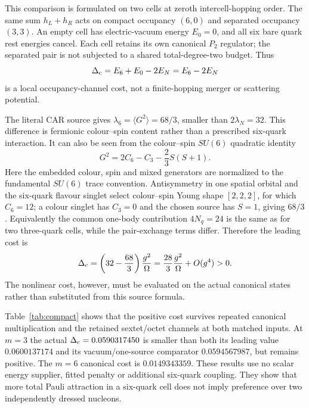 \documentclass[11pt]{article}
\begin{document}
This comparison is formulated on two cells at zeroth intercell-hopping order. The same sum $h_L+h_R$ acts on compact occupancy $(6,0)$ and separated occupancy $(3,3)$. An empty cell has electric-vacuum energy $E_0=0$, and all six bare quark rest energies cancel. Each cell retains its own canonical $P_2$ regulator; the separated pair is not subjected to a shared total-degree-two budget. Thus
\begin{equation}
 \Delta_{\rm c}=E_6+E_0-2E_N=E_6-2E_N
 \label{eq:compactcost}
\end{equation}
is a local occupancy-channel cost, not a finite-hopping merger or scattering potential.

The literal CAR source gives $\lambda_6=\langle G^2\rangle=68/3$, smaller than $2\lambda_N=32$. This difference is fermionic colour--spin content rather than a prescribed six-quark interaction. It can also be seen from the colour--spin $SU(6)$ quadratic identity
\begin{equation}
 G^2=2C_6-C_3-\frac23S(S+1).
\end{equation}
Here the embedded colour, spin and mixed generators are normalized to the fundamental $SU(6)$ trace convention. Antisymmetry in one spatial orbital and the six-quark flavour singlet select colour--spin Young shape $[2,2,2]$, for which $C_6=12$; a colour singlet has $C_3=0$ and the chosen source has $S=1$, giving $68/3$. Equivalently the common one-body contribution $4N_q=24$ is the same as for two three-quark cells, while the pair-exchange terms differ. Therefore the leading cost is
\begin{equation}
 \Delta_{\rm c}=\left(32-\frac{68}{3}\right)\frac{g^2}{\Omega}
 =\frac{28}{3}\frac{g^2}{\Omega}+O(g^4)>0.
 \label{eq:leadingcompact}
\end{equation}
The nonlinear cost, however, must be evaluated on the actual canonical states rather than substituted from this source formula.

\CompactTable
Table~\ref{tab:compact} shows that the positive cost survives repeated canonical multiplication and the retained sextet/octet channels at both matched inputs. At $m=3$ the actual $\Delta_{\rm c}=0.0590317450$ is smaller than both its leading value $0.0600137174$ and its vacuum/one-source comparator $0.0594567987$, but remains positive. The $m=6$ canonical cost is $0.0149343359$. These results use no scalar energy supplier, fitted penalty or additional six-quark coupling. They show that more total Pauli attraction in a six-quark cell does not imply preference over two independently dressed nucleons.
\end{document}
